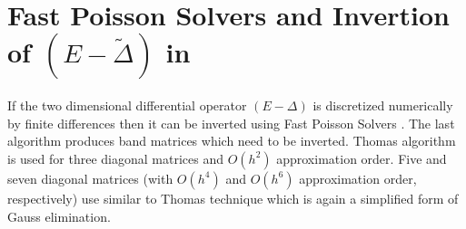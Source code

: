 \documentclass[11pt,a4paper,twoside]{article}
\begin{document}
\section{Fast Poisson Solvers and Invertion of $(E-\tilde \Delta)$ in }\label{FPSsection}

If the two dimensional differential operator $(E-\Delta)$ is discretized numerically by finite differences then it can be inverted using Fast Poisson Solvers \cite{FPS}. The last algorithm produces band matrices which need to be inverted. Thomas algorithm is used for three diagonal matrices and $O(h^2)$ approximation order.  Five and seven diagonal matrices (with $O(h^4)$ and $O(h^6)$ approximation order, respectively) use similar to Thomas technique which is again a simplified form of Gauss elimination.
\end{document}
